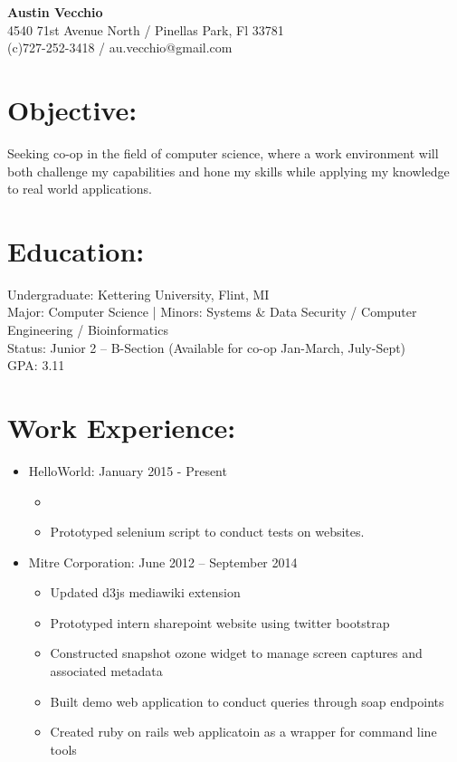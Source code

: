 \documentclass{res}
\begin{document}
\begin{center}
\LARGE{\textbf{Austin Vecchio}}\\
\normalsize{
4540 71st Avenue North / Pinellas Park, Fl 33781\\
(c)727-252-3418 / au.vecchio@gmail.com
}
\end{center}

\section{Objective:}
Seeking co-op in the field of computer science, where a work environment will both challenge my capabilities and hone my skills while applying my knowledge to real world applications.\\

\section{Education:}

Undergraduate: Kettering University, Flint, MI\\
Major: Computer Science
|   Minors: Systems \& Data Security / Computer Engineering / Bioinformatics\\
Status: Junior 2 – B-Section (Available for co-op Jan-March, July-Sept)\\
GPA: 3.11

\section{Work Experience:}
\begin{itemize}
\item HelloWorld: \hspace{45pt} January 2015 - Present
\begin{itemize}[label=$\circ$]
\item
\item Prototyped selenium script to conduct tests on websites.
\end{itemize}
\item Mitre Corporation: \hspace{45pt} June 2012 – September 2014
\begin{itemize}[label=$\circ$]
\item Updated d3js mediawiki extension
\item Prototyped intern sharepoint website using twitter bootstrap
\item Constructed snapshot ozone widget to manage screen captures and associated metadata
\item Built demo web application to conduct queries through soap endpoints
\item Created ruby on rails web applicatoin as a wrapper for command line tools
\end{itemize}
\end{itemize}
\end{document}
